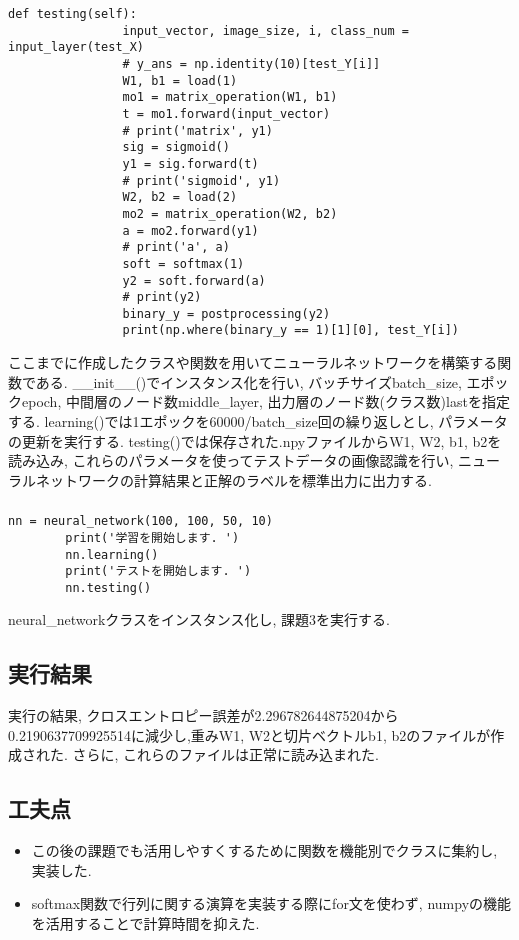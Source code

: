 \documentclass[a4j, titlepage]{jarticle}
\begin{document}
\begin{lstlisting}[caption=ニューラルネットワーク,label=fuga]
            def testing(self):
                input_vector, image_size, i, class_num = input_layer(test_X)
                # y_ans = np.identity(10)[test_Y[i]]
                W1, b1 = load(1)
                mo1 = matrix_operation(W1, b1)
                t = mo1.forward(input_vector)
                # print('matrix', y1)
                sig = sigmoid()
                y1 = sig.forward(t)
                # print('sigmoid', y1)
                W2, b2 = load(2)
                mo2 = matrix_operation(W2, b2)
                a = mo2.forward(y1)
                # print('a', a)
                soft = softmax(1)
                y2 = soft.forward(a)
                # print(y2)
                binary_y = postprocessing(y2)
                print(np.where(binary_y == 1)[1][0], test_Y[i])
        \end{lstlisting}
        ここまでに作成したクラスや関数を用いてニューラルネットワークを構築する関数である.
        \_\_init\_\_()でインスタンス化を行い, バッチサイズbatch\_size, エポックepoch, 中間層のノード数middle\_layer, 出力層のノード数(クラス数)lastを指定する.
        learning()では1エポックを60000/batch\_size回の繰り返しとし, パラメータの更新を実行する. testing()では保存された.npyファイルからW1, W2, b1, b2を読み込み, これらのパラメータを使ってテストデータの画像認識を行い, ニューラルネットワークの計算結果と正解のラベルを標準出力に出力する.

    \subsubsection*{}
        \begin{lstlisting}[caption=課題3の実行,label=fuga]
        nn = neural_network(100, 100, 50, 10)
        print('学習を開始します. ')
        nn.learning()
        print('テストを開始します. ')
        nn.testing()
        \end{lstlisting}
        neural\_networkクラスをインスタンス化し, 課題3を実行する.

\subsection*{実行結果}
    実行の結果, クロスエントロピー誤差が2.296782644875204から0.2190637709925514に減少し,重みW1, W2と切片ベクトルb1, b2のファイルが作成された. さらに, これらのファイルは正常に読み込まれた.

\subsection*{工夫点}
    \begin{itemize}
        \item この後の課題でも活用しやすくするために関数を機能別でクラスに集約し, 実装した.
        \item softmax関数で行列に関する演算を実装する際にfor文を使わず, numpyの機能を活用することで計算時間を抑えた.
    \end{itemize}
\end{document}
